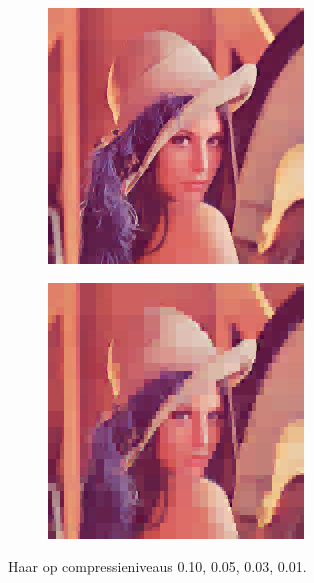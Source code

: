 \documentclass[11pt]{report}
\theoremstyle{plain}
\theoremstyle{remark}
\begin{document}
\begin{figure}
\begin{subfigure}[b]{0.24\textwidth}
	\end{subfigure}
	\begin{subfigure}[b]{0.24\textwidth}
		\centering
		\includegraphics[width=\textwidth]{plaatjes/Lenna_haar_0_03.png}
	\end{subfigure}
	\begin{subfigure}[b]{0.24\textwidth}
		\centering
		\includegraphics[width=\textwidth]{plaatjes/Lenna_haar_0_01.png}
	\end{subfigure}	
	\caption{Haar op compressieniveaus 0.10, 0.05, 0.03, 0.01.}
\end{figure}
\end{document}
